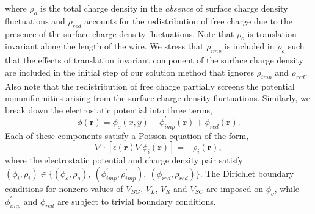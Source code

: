 \documentclass[aps,prmaterials,twocolumn,superscriptaddress,longbibliography]{revtex4-2}
\begin{document}
where $\rho_o$ is the total charge density in the \textit{absence} of surface charge density fluctuations and $\rho_{red}$ accounts for the redistribution of free charge due to the presence of the surface charge density fluctuations. Note that $\rho_o$ is translation invariant along the length of the wire. We stress that $\bar{\rho}_{imp}$ is included in $\rho_o$ such that the effects of translation invariant component of the surface charge density are included in the initial step of our solution method that ignores $\rho_{imp}^\prime$ and $\rho_{red}$. Also note that the redistribution of free charge partially screens the potential nonuniformities arising from the surface charge density fluctuations. Similarly, we break down the electrostatic potential into three terms,
\begin{equation}
    \phi(\mathbf{r}) = \phi_o(x,y) + \phi_{imp}^\prime(\mathbf{r}) + \phi_{red}(\mathbf{r}).
\end{equation}
Each of these components satisfy a Poisson equation of the form,
\begin{equation}
    \nabla \cdot \left[\epsilon(\mathbf{r}) \nabla\phi_i(\mathbf{r})\right] =
    	  -\rho_i(\mathbf{r}), \label{PoisComp}
\end{equation}
where the electrostatic potential and charge density pair satisfy $(\phi_i,\rho_i)\in \{(\phi_o,\rho_o), ~(\phi_{imp}^\prime,\rho_{imp}^\prime), ~(\phi_{red},\rho_{red}) \}$. The Dirichlet boundary conditions for nonzero values of $V_{BG}$, $V_L$, $V_R$ and $V_{SC}$ are imposed on $\phi_o$, while  $\phi_{imp}^\prime$ and $\phi_{red}$ are subject to trivial boundary conditions.
\end{document}
